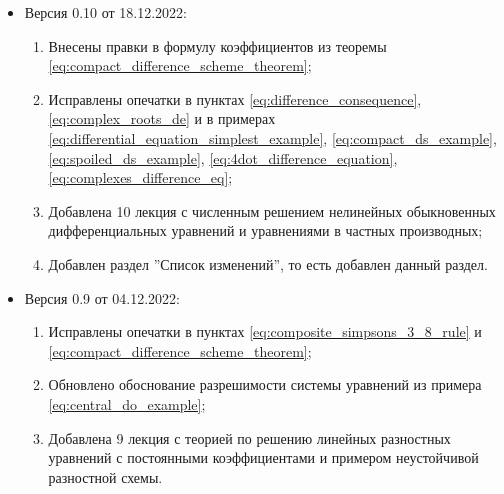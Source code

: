 \documentclass{article}
\begin{document}
\begin{itemize}[nosep]
\item Версия 0.10 от 18.12.2022:
	\begin{enumerate}[nosep]
		\item Внесены правки в формулу коэффициентов из
			теоремы
			\eqref{eq:compact_difference_scheme_theorem};
		\item Исправлены опечатки в пунктах
			\eqref{eq:difference_consequence},
			\eqref{eq:complex_roots_de}
			и в примерах
			\eqref{eq:differential_equation_simplest_example},
			\eqref{eq:compact_ds_example},
			\eqref{eq:spoiled_ds_example},
			\eqref{eq:4dot_difference_equation},
			\eqref{eq:complexes_difference_eq};
		\item Добавлена 10 лекция с численным решением нелинейных
			обыкновенных дифференциальных уравнений и уравнениями
			в частных производных;
		\item Добавлен раздел ''Список изменений'', то есть добавлен
			данный раздел.
	\end{enumerate}

\item Версия 0.9 от 04.12.2022:
	\begin{enumerate}[nosep]
		\item Исправлены опечатки в пунктах
			\eqref{eq:composite_simpsons_3_8_rule} и
			\eqref{eq:compact_difference_scheme_theorem};
		\item Обновлено обоснование разрешимости системы уравнений из
			примера \eqref{eq:central_do_example};
		\item Добавлена 9 лекция с теорией по решению линейных
			разностных уравнений с постоянными коэффициентами и
			примером неустойчивой разностной схемы.
	\end{enumerate}
\end{itemize}
\end{document}
